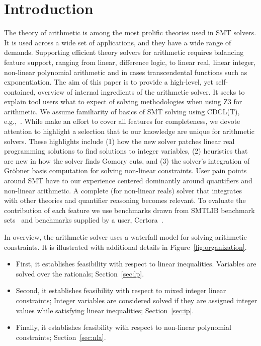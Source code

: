 \section{Introduction}

The theory of arithmetic
is among the most prolific theories used in SMT solvers. It is used across a wide set of
applications, and they have a wide range of demands.
Supporting efficient theory solvers for arithmetic requires balancing feature support,
ranging from linear, difference logic, to linear real, linear integer, non-linear polynomial arithmetic
and in cases transcendental functions such as exponentiation.
The aim of this paper is to provide a high-level, yet self-contained, overview of internal ingredients of the arithmetic solver.
It seeks to explain tool users what to expect of solving methodologies when using Z3 for arithmetic.
We assume familiarity of basics of SMT solving using CDCL(T), e.g.,~\cite{z3internals}.
While make an effort to cover all features for completeness,
we devote attention to highlight a selection that to our knowledge are unique for arithmetic solvers.
These highlights include
(1) how the new solver patches linear real programming solutions to find solutions to integer variables,
(2) heuristics that are new in how the solver finds Gomory cuts, and
(3) the solver's integration of Gr{\"o}bner basis computation for solving non-linear constraints.
User pain points around SMT have to our experience centered dominantly
around quantifiers and non-linear arithmetic. A complete (for non-linear reals) solver that integrates
with other theories and quantifier reasoning becomes relevant.
To evaluate the contribution of each feature we use benchmarks drawn
from SMTLIB benchmark sets~\cite{SMTLIB2} and benchmarks supplied by a user, 
Certora~\cite{bench-submission}.

In overview, the arithmetic solver uses a waterfall model for solving arithmetic constraints.
It is illustrated with additional details in Figure~\ref{fig:organization}.


\begin{itemize}
  \item First, it establishes feasibility with respect to linear inequalities. Variables are solved over the rationals; Section~\ref{sec:lp}.
  \item Second, it establishes feasibility with respect to mixed integer linear constraints; 
        Integer variables are considered solved if they are assigned integer values while satisfying linear inequalities; Section~\ref{sec:ip}. 
  \item Finally, it establishes feasibility with respect to non-linear polynomial constraints; Section~\ref{sec:nla}.
\end{itemize}


